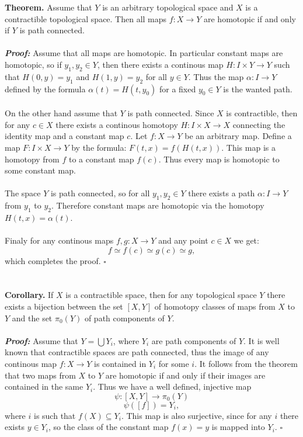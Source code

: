 \documentclass[12pt]{article}
\begin{document}
\textbf{Theorem.} Assume that $Y$ is an arbitrary topological space and $X$ is a contractible topological space. Then all maps $f:X\rightarrow Y$ are homotopic if and only if $Y$ is path connected.\\ \\
\textbf{\textit{Proof:}} Assume that all maps are homotopic. In particular constant maps are homotopic, so if $y_{1},y_{2}\in Y$, then there exists a continous map $H:I\times Y\rightarrow Y$ such that $H(0,y)=y_1$ and $H(1,y)=y_2$ for all $y\in Y$. Thus the map $\alpha:I\rightarrow Y$ defined by the formula $\alpha(t)=H(t,y_0)$ for a fixed $y_0\in Y$ is the wanted path.\\ \\
On the other hand assume that $Y$ is path connected. Since $X$ is contractible, then for any $c\in X$ there exists a continous homotopy $H:I\times X\rightarrow X$ connecting the identity map and a constant map $c$. Let $f:X\rightarrow Y$ be an arbitrary map. Define a map $F:I\times X\rightarrow Y$ by the formula: $F(t,x)=f(H(t,x))$. This map is a homotopy from $f$ to a constant map $f(c)$. Thus every map is homotopic to some constant map.\\ \\
The space $Y$ is path connected, so for all $y_1,y_2\in Y$ there exists a path $\alpha:I\rightarrow Y$ from $y_1$ to $y_2$. Therefore constant maps are homotopic via the homotopy $H(t,x)=\alpha(t)$.\\ \\
Finaly for any continous maps $f,g:X\rightarrow Y$ and any point $c\in X$ we get:
$$f\simeq f(c)\simeq g(c)\simeq g,$$
which completes the proof. $\square$ \\ \\ \\
\textbf{Corollary.} If $X$ is a contractible space, then for any topological space $Y$ there exists a bijection between the set $[X,Y]$ of homotopy classes of maps from $X$ to $Y$ and the set $\pi_0(Y)$ of path components of $Y$.\\ \\ 
\textbf{\textit{Proof:}} Assume that $Y=\bigcup Y_{i}$, where $Y_i$ are path components of $Y$. It is well known that contractible spaces are path connected, thus the image of any continous map $f:X\rightarrow Y$ is contained in $Y_i$ for some $i$. It follows from the theorem that two maps from $X$ to $Y$ are homotopic if and only if their images are contained in the same $Y_i$. Thus we have a well defined, injective map $$\psi:[X,Y]\rightarrow\pi_0(Y)$$ $$\psi([f])=Y_i,$$ where $i$ is such that $f(X)\subseteq Y_i$. This map is also surjective, since for any $ i $ there exists  $y\in Y_i$, so the class of the constant map $f(x)=y$ is mapped into $Y_i$. $\square$
\end{document}

